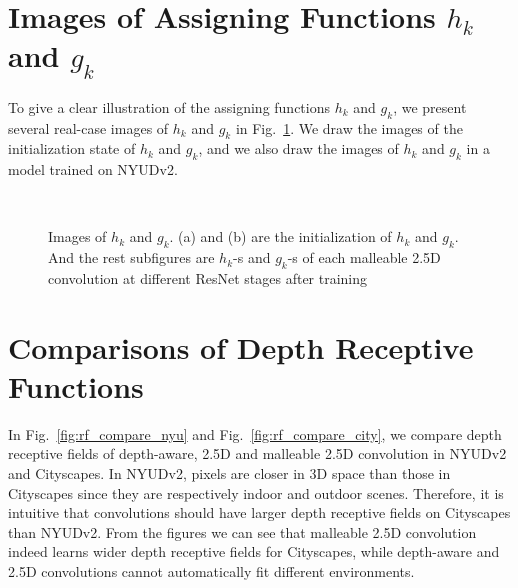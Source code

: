 \documentclass[runningheads]{llncs}
\begin{document}
\section{Images of Assigning Functions $h_k$ and $g_k$}
To give a clear illustration of the assigning functions $h_k$ and $g_k$, we present several real-case images of $h_k$ and $g_k$ in Fig.~\ref{fig:h_g}.
We draw the images of the initialization state of $h_k$ and $g_k$, and we also draw the images of $h_k$ and $g_k$ in a model trained on NYUDv2.
\begin{figure}[htbp]
  \centering
  \\
  \caption{
    Images of $h_k$ and $g_k$.
    (a) and (b) are the initialization of $h_k$ and $g_k$.
    And the rest subfigures are $h_k$-s and $g_k$-s of each malleable 2.5D convolution at different ResNet stages after training
  }
  \label{fig:h_g}
\end{figure}

\section{Comparisons of Depth Receptive Functions}
In Fig.~\ref{fig:rf_compare_nyu} and Fig.~\ref{fig:rf_compare_city}, we compare depth receptive fields of depth-aware, 2.5D and malleable 2.5D convolution in NYUDv2 and Cityscapes.
In NYUDv2, pixels are closer in 3D space than those in Cityscapes since they are respectively indoor and outdoor scenes.
Therefore, it is intuitive that convolutions should have larger depth receptive fields on Cityscapes than NYUDv2.
From the figures we can see that malleable 2.5D convolution indeed learns wider depth receptive fields for Cityscapes, while depth-aware and 2.5D convolutions cannot automatically fit different environments.
\end{document}
